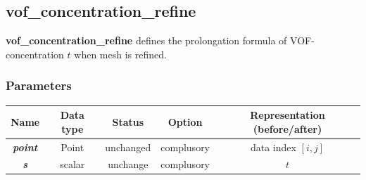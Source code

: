 \documentclass[a4paper]{article}
\newcommand{\func}[1]{\textbf{\textcolor{function}{#1}}}
\newcommand{\para}[1]{\textbf{\emph{\textcolor{para}{#1}}}}
\begin{document}
\subsection{\func{vof\_concentration\_refine}}
\func{vof\_concentration\_refine} defines the prolongation formula of VOF-concentration $t$ when mesh is refined.
\subsubsection{Parameters}
\begin{table}[h]
  \centering
  \begin{tabular}{|c|c|c|c|c|}
    \hline
    Name & Data type & Status & Option & Representation (before/after)\\[0.5ex]
    \hline\hline
    \para{point} & Point & unchanged & complusory & data index $[i,j]$\\
    \hline
    \para{s} & scalar & unchange & complusory & $t$\\
    \hline
  \end{tabular}
\end{table}
\end{document}

